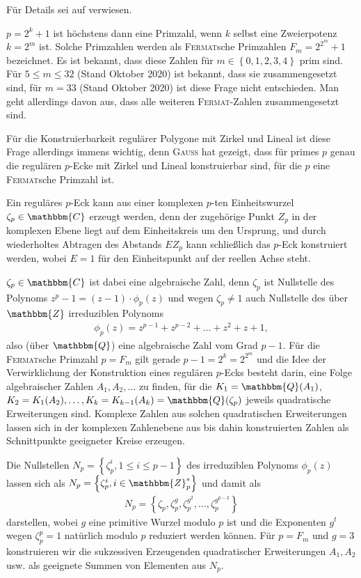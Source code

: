 \documentclass[11pt]{article}
\newcommand{\cbr}[1]{\ensuremath{\left\{#1\right\}}}
\newcommand{\Z}{\mathbbm{Z}}
\newcommand{\Q}{\mathbbm{Q}}
\newcommand{\C}{\mathbbm{C}}
\begin{document}
Für Details sei auf \cite{Graebe2012} verwiesen. 

$p=2^k+1$ ist höchstens dann eine Primzahl, wenn $k$ selbst eine Zweierpotenz
$k=2^m$ ist.  Solche Primzahlen werden als \textsc{Fermat}sche Primzahlen
$F_m=2^{2^m}+1$ bezeichnet. Es ist bekannt, dass diese Zahlen für
$m\in\cbr{0,1,2,3,4}$ prim sind. Für $5\le m\le 32$ (Stand Oktober 2020) ist
bekannt, dass sie zusammengesetzt sind, für $m=33$ (Stand Oktober 2020) ist
diese Frage nicht entschieden.  Man geht allerdings davon aus, dass alle
weiteren \textsc{Fermat}-Zahlen zusammengesetzt sind.

Für die Konstruierbarkeit regulärer Polygone mit Zirkel und Lineal ist diese
Frage allerdings immens wichtig, denn \textsc{Gauß} hat gezeigt, dass für
primes $p$ genau die regulären $p$-Ecke mit Zirkel und Lineal konstruierbar
sind, für die $p$ eine \textsc{Fermat}sche Primzahl ist.

Ein reguläres $p$-Eck kann aus einer komplexen $p$-ten Einheitswurzel
$\zeta_p\in\C$ erzeugt werden, denn der zugehörige Punkt $Z_p$ in der
komplexen Ebene liegt auf dem Einheitskreis um den Ursprung, und durch
wiederholtes Abtragen des Abstands $EZ_p$ kann schließlich das $p$-Eck
konstruiert werden, wobei $E=1$ für den Einheitspunkt auf der reellen Achse
steht.

$\zeta_p\in\C$ ist dabei eine algebraische Zahl, denn $\zeta_p$ ist Nullstelle
des Polynoms $z^p-1=(z-1)\cdot \phi_p(z)$ und wegen $\zeta_p\neq 1$ auch
Nullstelle des über $\Z$ irreduziblen Polynoms
\begin{gather*}
  \phi_p(z)=z^{p-1}+z^{p-2}+\dots+z^2+z+1,
\end{gather*}
also (über $\Q$) eine algebraische Zahl vom Grad $p-1$.  Für die
\textsc{Fermat}sche Primzahl $p=F_m$ gilt gerade $p-1=2^k=2^{2^m}$ und die
Idee der Verwirklichung der Konstruktion eines regulären $p$-Ecks besteht
darin, eine Folge algebraischer Zahlen $A_1, A_2,\ldots$ zu finden, für die
$K_1=\Q(A_1)$, $K_2=K_1(A_2), \ldots, K_k=K_{k-1}(A_k)=\Q(\zeta_p)$ jeweils
quadratische Erweiterungen sind. Komplexe Zahlen aus solchen quadratischen
Erweiterungen lassen sich in der komplexen Zahlenebene aus bis dahin
konstruierten Zahlen als Schnittpunkte geeigneter Kreise erzeugen.

Die Nullstellen $N_p=\cbr{\zeta_p^i, 1\le i\le p-1}$ des irreduziblen Polynoms
$\phi_p(z)$ lassen sich als $N_p=\cbr{\zeta_p^i, i\in\Z_p^\ast}$ und damit als
\begin{gather*}
  N_p=\cbr{\zeta_p,\zeta_p^g, \zeta_p^{g^2}, \dots, \zeta_p^{g^{p-2}}}
\end{gather*}
darstellen, wobei $g$ eine primitive Wurzel modulo $p$ ist und die Exponenten
$g^t$ wegen $\zeta_p^p=1$ natürlich modulo $p$ reduziert werden können.  Für
$p=F_m$ und $g=3$ konstruieren wir die sukzessiven Erzeugenden quadratischer
Erweiterungen $A_1, A_2$ usw. als geeignete Summen von Elementen aus $N_p$.
\end{document}
